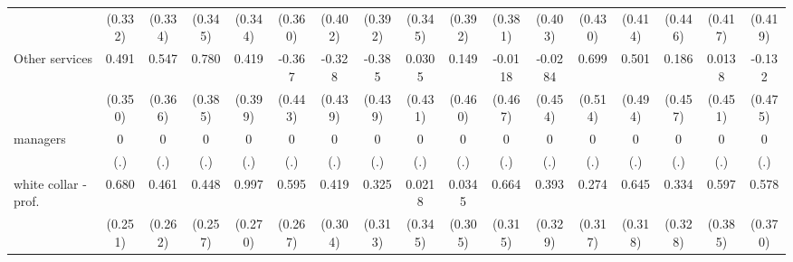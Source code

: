 {\begin{tabular}{l*{16}{c}}
                    &     (0.332)         &     (0.334)         &     (0.345)         &     (0.344)         &     (0.360)         &     (0.402)         &     (0.392)         &     (0.345)         &     (0.392)         &     (0.381)         &     (0.403)         &     (0.430)         &     (0.414)         &     (0.446)         &     (0.417)         &     (0.419)         \\
[1em]
Other services      &       0.491         &       0.547         &       0.780\sym{*}  &       0.419         &      -0.367         &      -0.328         &      -0.385         &      0.0305         &       0.149         &     -0.0118         &     -0.0284         &       0.699         &       0.501         &       0.186         &      0.0138         &      -0.132         \\
                    &     (0.350)         &     (0.366)         &     (0.385)         &     (0.399)         &     (0.443)         &     (0.439)         &     (0.439)         &     (0.431)         &     (0.460)         &     (0.467)         &     (0.454)         &     (0.514)         &     (0.494)         &     (0.457)         &     (0.451)         &     (0.475)         \\
[1em]
managers            &           0         &           0         &           0         &           0         &           0         &           0         &           0         &           0         &           0         &           0         &           0         &           0         &           0         &           0         &           0         &           0         \\
                    &         (.)         &         (.)         &         (.)         &         (.)         &         (.)         &         (.)         &         (.)         &         (.)         &         (.)         &         (.)         &         (.)         &         (.)         &         (.)         &         (.)         &         (.)         &         (.)         \\
[1em]
white collar - prof.&       0.680\sym{**} &       0.461         &       0.448         &       0.997\sym{***}&       0.595\sym{*}  &       0.419         &       0.325         &      0.0218         &      0.0345         &       0.664\sym{*}  &       0.393         &       0.274         &       0.645\sym{*}  &       0.334         &       0.597         &       0.578         \\
                    &     (0.251)         &     (0.262)         &     (0.257)         &     (0.270)         &     (0.267)         &     (0.304)         &     (0.313)         &     (0.345)         &     (0.305)         &     (0.315)         &     (0.329)         &     (0.317)         &     (0.318)         &     (0.328)         &     (0.385)         &     (0.370)         \\

\end{tabular}}
